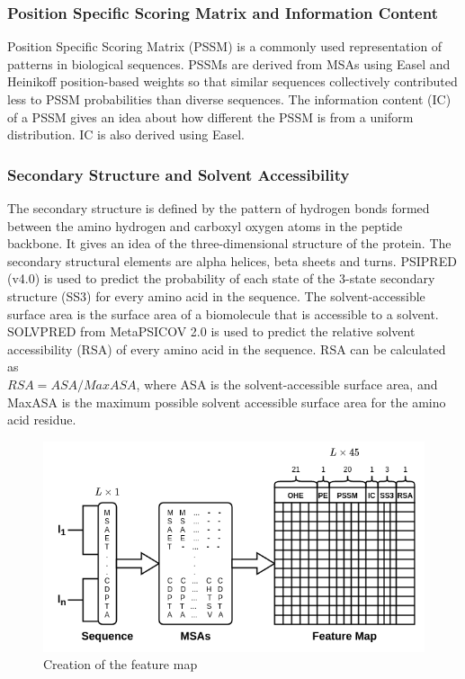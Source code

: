 \documentclass[journal=jacsat,manuscript=article]{achemso}
\begin{document}
\subsubsection{Position Specific Scoring Matrix and Information Content}
\quad Position Specific Scoring Matrix (PSSM) is a commonly used representation of patterns in biological sequences. PSSMs are derived from MSAs using Easel \cite{potter2018hmmer} and Heinikoff position-based weights so that similar sequences collectively contributed less to PSSM probabilities than diverse sequences. The information content (IC) of a PSSM gives an idea about how different the PSSM is from a uniform distribution. IC is also derived using Easel.

\subsubsection{Secondary Structure and Solvent Accessibility}
\quad The secondary structure is defined by the pattern of hydrogen bonds formed between the amino hydrogen and carboxyl oxygen atoms in the peptide backbone. It gives an idea of the three-dimensional structure of the protein. The secondary structural elements are alpha helices, beta sheets and turns. PSIPRED (v4.0) \cite{jones1999protein} is used to predict the probability of each state of the 3-state secondary structure (SS3) for every amino acid in the sequence. The solvent-accessible surface area is the surface area of a biomolecule that is accessible to a solvent. SOLVPRED from MetaPSICOV 2.0\cite{jones2015metapsicov} is used to predict the relative solvent accessibility (RSA) of every amino acid in the sequence. RSA can be calculated as \\ ${RSA} = {ASA} / {MaxASA}$, where ASA is the solvent-accessible surface area, and MaxASA is the maximum possible solvent accessible surface area for the amino acid residue.

\begin{figure}
    \centering
    \noindent\includegraphics[scale=0.6]{feature_map}
    \caption{\centering Creation of the feature map}
    \label{fig:feature_map}
\end{figure}
\end{document}
